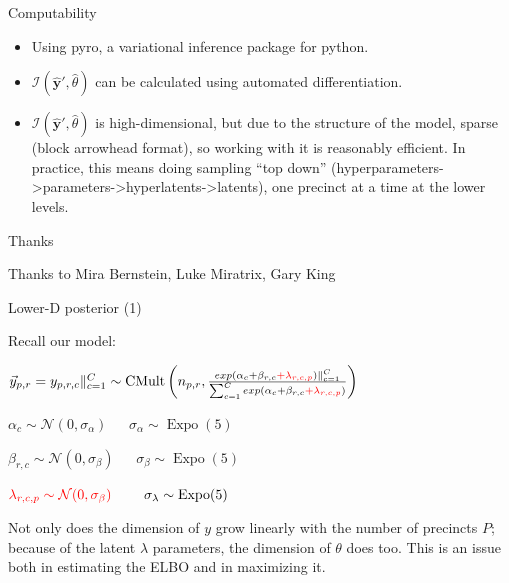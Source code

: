 \documentclass[
  ignorenonframetext,
]{beamer}
\providecommand{\tightlist}{%
  \setlength{\itemsep}{0pt}\setlength{\parskip}{0pt}}
\begin{document}
\begin{frame}{Computability}
\protect\hypertarget{computability}{}

\begin{itemize}
\tightlist
\item
  Using pyro, a variational inference package for python.
\item
  \(\mathcal{I}(\hat{\bm{y}}',\hat{\theta})\) can be calculated using
  automated differentiation.
\item
  \(\mathcal{I}(\hat{\bm{y}}',\hat{\theta})\) is high-dimensional, but
  due to the structure of the model, sparse (block arrowhead format), so
  working with it is reasonably efficient. In practice, this means doing
  sampling ``top down''
  (hyperparameters-\textgreater{}parameters-\textgreater{}hyperlatents-\textgreater{}latents),
  one precinct at a time at the lower levels.
\end{itemize}

\end{frame}

\begin{frame}{Thanks}
\protect\hypertarget{thanks-1}{}

Thanks to Mira Bernstein, Luke Miratrix, Gary King

\end{frame}

\begin{frame}{Lower-D posterior (1)}
\protect\hypertarget{lower-d-posterior-1}{}

Recall our model:

\(\vec{y}_{p,r}=y_{p,r,c}\Vert_{c=1}^C\sim \operatorname{CMult}\left(n_{p,r},\frac{exp(\alpha_c+\beta_{r,c}\textcolor{red}{+\lambda_{r,c,p}})\Vert_{c=1}^C}{\sum_{c=1}^Cexp(\alpha_c+\beta_{r,c}\textcolor{red}{+\lambda_{r,c,p}})}\right)\)

\(\alpha_c\sim\mathcal{N}(0,\sigma_\alpha)~~~~~~~\sigma_\alpha\sim\operatorname{Expo}(5)\)

\(\beta_{r,c}\sim\mathcal{N}(0,\sigma_\beta)~~~~~~~\sigma_\beta\sim\operatorname{Expo}(5)\)

\(\textcolor{red}{\lambda_{r,c,p}\sim\mathcal{N}(0,\sigma_\beta)}~~~~~~~\sigma_\lambda\sim\operatorname{Expo}(5)\)

Not only does the dimension of \(y\) grow linearly with the number of
precincts \(P\); because of the latent \(\lambda\) parameters, the
dimension of \(\theta\) does too. This is an issue both in estimating
the ELBO and in maximizing it.

\end{frame}
\end{document}
